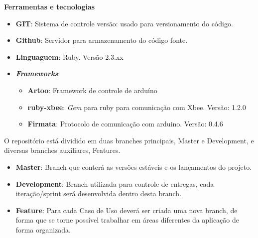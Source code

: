\textbf{Ferramentas e tecnologias}

\begin{itemize}
    \item \textbf{GIT}: Sistema de controle versão: usado para versionamento do código.
    \item \textbf{Github}: Servidor para armazenamento do código fonte.
    \item \textbf{Linguaguem}: Ruby. Versão 2.3.xx
    \item \textit{\textbf{Frameworks}}:
    \begin{itemize}
        \item \textbf{Artoo}: Framework de controle de arduíno
        \item \textbf{ruby-xbee}: \textit{Gem} para ruby para comunicação com Xbee. Versão: 1.2.0
        \item \textbf{Firmata}: Protocolo de comunicação com arduino. Versão: 0.4.6
    \end{itemize}
\end{itemize}

O repositório está dividido em duas branches principais, Master e Development, e diversas branches auxiliares, Features.

\begin{itemize}
\item \textbf{Master}: Branch que conterá as versões estáveis e os lançamentos do projeto.
\item \textbf{Development}:  Branch utilizada para controle de entregas, cada iteração/sprint será desenvolvida dentro desta branch.
\item \textbf{Feature}: Para cada Caso de Uso deverá ser criada uma nova branch, de forma que se torne possível trabalhar em áreas diferentes da aplicação de forma organizada.
\end{itemize}
